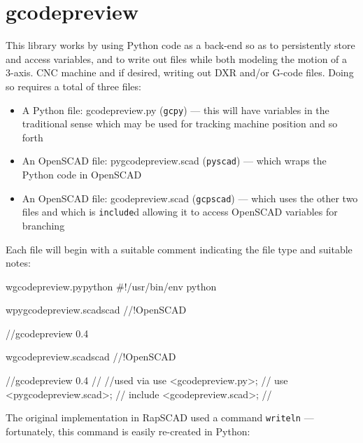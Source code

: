\documentclass{ltxdoc}
\begin{document}
\clearpage
\section{gcodepreview}

This library works by using Python code as a back-end so as to persistently
store and access variables, and to write out files while both modeling the motion of a 3-axis. 
CNC machine and if desired, writing out DXR and/or G-code files. Doing so requires a total of 
three files:

\begin{itemize}
\item A Python file: gcodepreview.py (\texttt{gcpy}) --- this will have variables in the 
      traditional sense which may be used for tracking machine position and so forth
\item An OpenSCAD file: pygcodepreview.scad (\texttt{pyscad}) --- which wraps the Python code 
      in OpenSCAD
\item An OpenSCAD file: gcodepreview.scad (\texttt{gcpscad}) --- which uses the other two files 
      and which is \texttt{include}d allowing it to access OpenSCAD variables for branching   
\end{itemize}
 
Each file will begin with a suitable comment indicating the file type and suitable notes:

\begin{writecode}{w}{gcodepreview.py}{python}
#!/usr/bin/env python

\end{writecode}
\addtocounter{gcpy}{3}

\begin{writecode}{w}{pygcodepreview.scad}{scad}
//!OpenSCAD
 
//gcodepreview 0.4

\end{writecode}
\addtocounter{pyscad}{5}

\begin{writecode}{w}{gcodepreview.scad}{scad}
//!OpenSCAD
 
//gcodepreview 0.4
//
//used via use <gcodepreview.py>;
//         use <pygcodepreview.scad>;
//         include <gcodepreview.scad>;
//

\end{writecode}
\addtocounter{gcpscad}{10}

The original implementation in RapSCAD used a command \texttt{writeln} 
--- fortunately, this command is easily re-created in Python:
\end{document}
